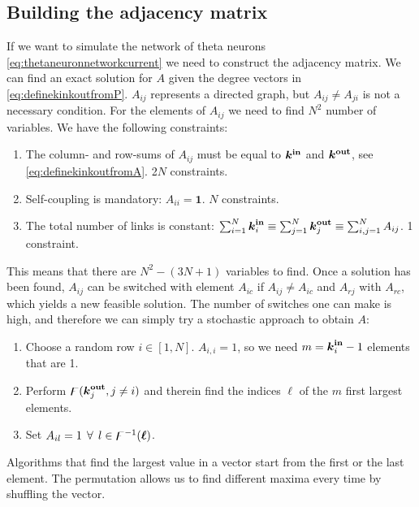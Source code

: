 \subsection{Building the adjacency matrix} \label{sec:buildingA}
If we want to simulate the network of theta neurons \eqref{eq:thetaneuronnetworkcurrent} we need to construct the adjacency matrix. We can find an exact solution for $A$ given the degree vectors in \eqref{eq:definekinkoutfromP}. $A_{ij}$ represents a directed graph, but $A_{ij} \neq A_{ji}$ is not a necessary condition. For the elements of $A_{ij}$ we need to find $N^2$ number of variables. We have the following constraints:
\begin{enumerate}
\item The column- and row-sums of $A_{ij}$ must be equal to ${\boldsymbol{k^{\rm in}}}$ and $\boldsymbol{{k^{\rm out}}}$, see \eqref{eq:definekinkoutfromA}. 2$N$ constraints.
\item Self-coupling is mandatory: $A_{ii} = \boldsymbol{1}$. $N$ constraints.
\item The total number of links is constant: $\sum_{i=1}^{N} {\boldsymbol{k}_i^{\bf in}} \equiv \sum_{j=1}^{N} {\boldsymbol{k}_j^{\bf out}} \equiv \sum_{i,j=1}^{N}A_{i j}$. 1 constraint.
\end{enumerate}
This means that there are $N^2 - (3N + 1)$ variables to find. Once a solution has been found, $A_{ij}$ can be switched with element $A_{ic}$ if $A_{ij} \neq A_{ic}$ and $A_{rj}$ with $A_{rc}$, which yields a new feasible solution. The number of switches one can make is high, and therefore we can simply try a stochastic approach to obtain $A$:
\begin{enumerate}
\item Choose a random row $i \in [1,N]$. $A_{i,i} = 1$, so we need $m = {\boldsymbol{k}_i^{\bf in}} - 1$ elements that are 1.
\item Perform ${\digamma} ( {\boldsymbol{k}_j^{\bf out}}, j \neq i)$ and therein find the indices $\boldsymbol{\ell}$ of the $m$ first largest elements. 
\item Set $A_{il} = 1 \: \: \forall \: \: l \in {\digamma^{-1}} (\boldsymbol{\ell})$.
\end{enumerate}
Algorithms that find the largest value in a vector start from the first or the last element. The permutation allows us to find different maxima every time by shuffling the vector.

